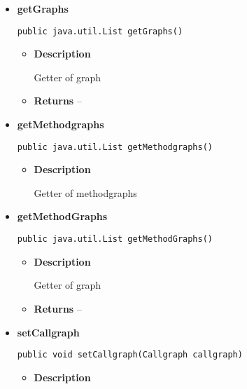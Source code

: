 {{{{{{{\begin{itemize}
{\begin{itemize}
{}%
\end{itemize}
}%
\item{ 
{\bf  getGraphs}\\
\begin{lstlisting}[frame=none]
public java.util.List getGraphs()\end{lstlisting} %
\begin{itemize}
\item{
{\bf  Description}

Getter of graph
}
\item{{\bf  Returns} -- 
 
}%
\end{itemize}
}%
\item{ 
{\bf  getMethodgraphs}\\
\begin{lstlisting}[frame=none]
public java.util.List getMethodgraphs()\end{lstlisting} %
\begin{itemize}
\item{
{\bf  Description}

Getter of methodgraphs
}
\end{itemize}
}%
\item{ 
{\bf  getMethodGraphs}\\
\begin{lstlisting}[frame=none]
public java.util.List getMethodGraphs()\end{lstlisting} %
\begin{itemize}
\item{
{\bf  Description}

Getter of graph
}
\item{{\bf  Returns} -- 
 
}%
\end{itemize}
}%
\item{ 
{\bf  setCallgraph}\\
\begin{lstlisting}[frame=none]
public void setCallgraph(Callgraph callgraph)\end{lstlisting} %
\begin{itemize}
\item{
{\bf  Description}

}
\end{itemize}}
\end{itemize}}}}}}}}
